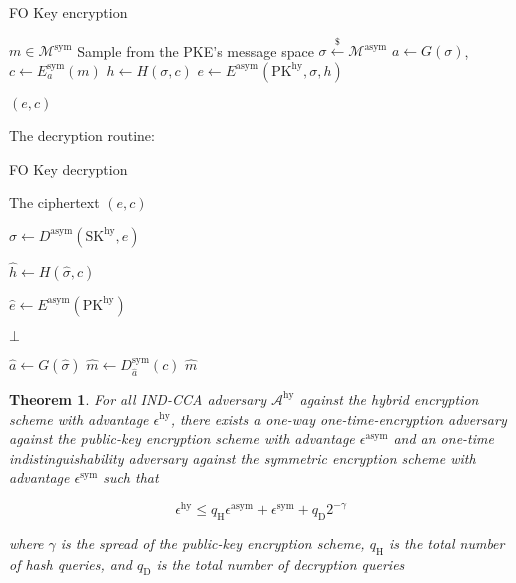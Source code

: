 \documentclass{article}
\newcommand{\leftsample}{\overset{{\scriptscriptstyle\$}}{\leftarrow}}
\newtheorem{theorem}{Theorem}[section]
\begin{document}
\begin{algorithm}
\caption{FO Key encryption}\label{fo-key-enc}
\begin{algorithmic}[1]  %
    \Require $m \in \mathcal{M}^\text{sym}$
    \State Sample from the PKE's message space $\sigma \leftsample \mathcal{M}^\text{asym}$
    \State $a \leftarrow G(\sigma)$, $c \leftarrow E^\text{sym}_a(m)$
    \State $h \leftarrow H(\sigma, c)$
    \State $e \leftarrow E^\text{asym}(\text{PK}^\text{hy}, \sigma, h)$

    \State \Return $(e, c)$
\end{algorithmic}
\end{algorithm}

\pagebreak

The decryption routine:

\begin{algorithm}
\caption{FO Key decryption}\label{fo-key-dec}
\begin{algorithmic}[1]  %
    \Require The ciphertext $(e, c)$

    \State $
        \hat{\sigma} \leftarrow D^\text{asym}(\text{SK}^\text{hy}, e)
    $

    \State $
        \hat{h} \leftarrow H(\hat{\sigma}, c)
    $

    \State $
        \hat{e} \leftarrow E^\text{asym}(\text{PK}^\text{hy})
    $

        \State \Return $\bot$
    \EndIf

    \State $\hat{a} \leftarrow G(\hat{\sigma})$
    \State $\hat{m} \leftarrow D^\text{sym}_{\hat{a}}(c)$
    \State \Return $\hat{m}$
\end{algorithmic}
\end{algorithm}

\begin{theorem}\label{fo-security-theorem}
    For all IND-CCA adversary $\mathcal{A}^\text{hy}$ against the hybrid encryption scheme with advantage $\epsilon^\text{hy}$, there exists a one-way one-time-encryption adversary against the public-key encryption scheme with advantage $\epsilon^\text{asym}$ and an one-time indistinguishability adversary against the symmetric encryption scheme with advantage $\epsilon^\text{sym}$ such that

    \begin{equation*}
        \epsilon^\text{hy} \leq q_\text{H}\epsilon^\text{asym} + \epsilon^\text{sym} + q_\text{D}2^{-\gamma}
    \end{equation*}

    where $\gamma$ is the spread of the public-key encryption scheme, $q_\text{H}$ is the total number of hash queries, and $q_\text{D}$ is the total number of decryption queries
\end{theorem}
\end{document}
